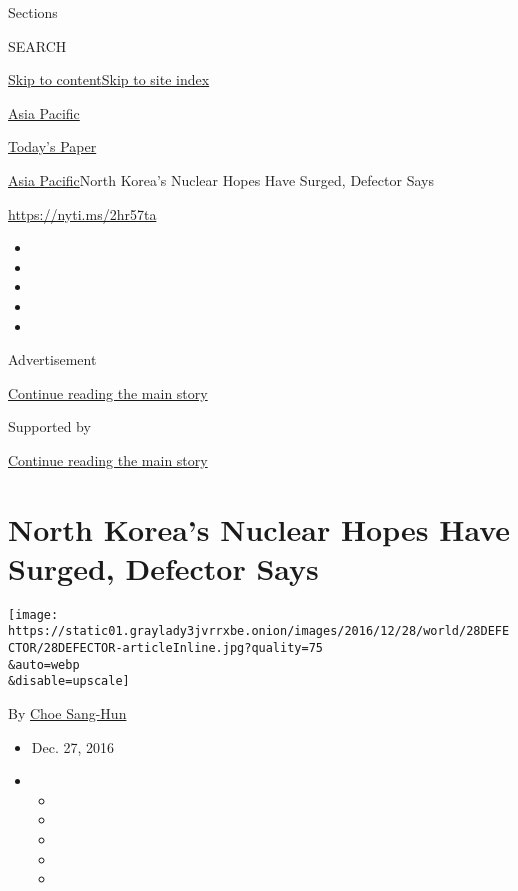 Sections

SEARCH

\protect\hyperlink{site-content}{Skip to
content}\protect\hyperlink{site-index}{Skip to site index}

\href{https://www.nytimes3xbfgragh.onion/section/world/asia}{Asia
Pacific}

\href{https://myaccount.nytimes3xbfgragh.onion/auth/login?response_type=cookie\&client_id=vi}{}

\href{https://www.nytimes3xbfgragh.onion/section/todayspaper}{Today's
Paper}

\href{/section/world/asia}{Asia Pacific}\textbar{}North Korea's Nuclear
Hopes Have Surged, Defector Says

\url{https://nyti.ms/2hr57ta}

\begin{itemize}
\item
\item
\item
\item
\item
\end{itemize}

Advertisement

\protect\hyperlink{after-top}{Continue reading the main story}

Supported by

\protect\hyperlink{after-sponsor}{Continue reading the main story}

\hypertarget{north-koreas-nuclear-hopes-have-surged-defector-says}{%
\section{North Korea's Nuclear Hopes Have Surged, Defector
Says}\label{north-koreas-nuclear-hopes-have-surged-defector-says}}

\texttt{[image: https://static01.graylady3jvrrxbe.onion/images/2016/12/28/world/28DEFECTOR/28DEFECTOR-articleInline.jpg?quality=75\\\&auto=webp\\\&disable=upscale]}

By \href{http://www.nytimes3xbfgragh.onion/by/choe-sang-hun}{Choe
Sang-Hun}

\begin{itemize}
\item
  Dec. 27, 2016
\item
  \begin{itemize}
  \item
  \item
  \item
  \item
  \item
  \end{itemize}
\end{itemize}

